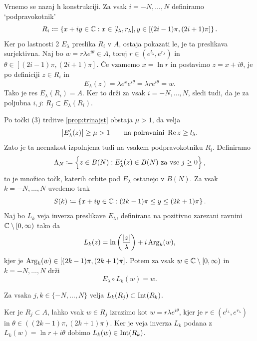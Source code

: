 \noindent Vrnemo se nazaj h konstrukciji. Za vsak \(i = -N, \dots, N\) definiramo `podpravokotnik'
\[R_i \coloneq \left\{ x + iy \in \mathbb C : x \in [l_\lambda, r_\lambda], y \in [(2i - 1) \pi, (2i + 1) \pi] \right\}.\]
Ker po lastnosti 2 \(E_\lambda\) preslika \(R_i\) v \(A\), ostaja pokazati le, je ta preslikava surjektivna. Naj bo \(w = r \lambda e^{i \theta} \in A\), torej \(r \in (e^{l_\lambda}, e^{r_\lambda})\) in \(\theta \in [(2i - 1) \pi, (2i + 1) \pi]\). Če vzamemo \(x = \ln r\) in postavimo \(z = x + i \theta\), je po definiciji \(z \in R_i\) in
\[E_\lambda (z) = \lambda e^x e^{i \theta} = \lambda r e^{i \theta} = w.\]
Tako je res \(E_\lambda (R_i) = A\). Ker to drži za vsak \(i = -N, \dots, N\), sledi tudi, da je za poljubna \(i, j\): \(R_j \subset E_\lambda (R_i)\).

Po točki (3) trditve \ref{prop:trinajst} obstaja \(\mu > 1\), da velja
\begin{equation} \label{eqn:mu-ocena}
    \bigl| E_\lambda' (z) \bigr| \geq \mu > 1 \qquad \text{na polravnini } \operatorname{Re} z \geq l_\lambda.
\end{equation}
Zato je ta neenakost izpolnjena tudi na vsakem podpravokotniku \(R_i\). Definiramo
\[\Lambda_N \coloneq \left\{ z \in B(N) : E_\lambda^j (z) \in B (N) \text{ za vse } j \geq 0 \right\},\]
to je množico točk, katerih orbite pod \(E_\lambda\) ostanejo v \(B (N)\). Za vsak \(k = -N, \dots, N\) uvedemo trak
\[S (k) \coloneq \left\{ x + i y \in \mathbb C : (2k - 1) \pi \leq y \leq (2k + 1) \pi \right\}.\]
Naj bo \(L_k\) veja inverza preslikave \(E_\lambda\), definirana na pozitivno zarezani ravnini \(\mathbb C \setminus [0, \infty)\) tako da
\[L_k (z) = \ln \left( \frac{|z|}{\lambda} \right) + i \operatorname{Arg}_k (w),\]
kjer je \(\operatorname{Arg}_k (w) \in [(2k - 1) \pi, (2k + 1) \pi]\). Potem za vsak \(w \in \mathbb C \setminus [0, \infty)\) in \(k = - N, \dots, N\) drži
\begin{equation} \label{eqn:inverz-e}
    E_\lambda \circ L_k (w) = w.
\end{equation}

\begin{trditev} \label{prop:claim}
    Za vsaka \(j, k \in \{-N, \dots, N\}\) velja \(L_k (R_j) \subset \operatorname{Int} (R_k)\).
\end{trditev}

\begin{dokaz}
    Ker je \(R_j \subset A\), lahko vsak \(w \in R_j\) izrazimo kot \(w = r \lambda e^{i \theta}\), kjer je \(r \in (e^{l_\lambda}, e^{r_\lambda})\) in \(\theta \in ((2k - 1) \pi, (2k + 1) \pi)\). Ker je veja inverza \(L_k\) podana z \(L_k (w) = \ln r + i \theta\) dobimo \(L_k (w) \in \operatorname{Int} (R_k)\).
\end{dokaz}

